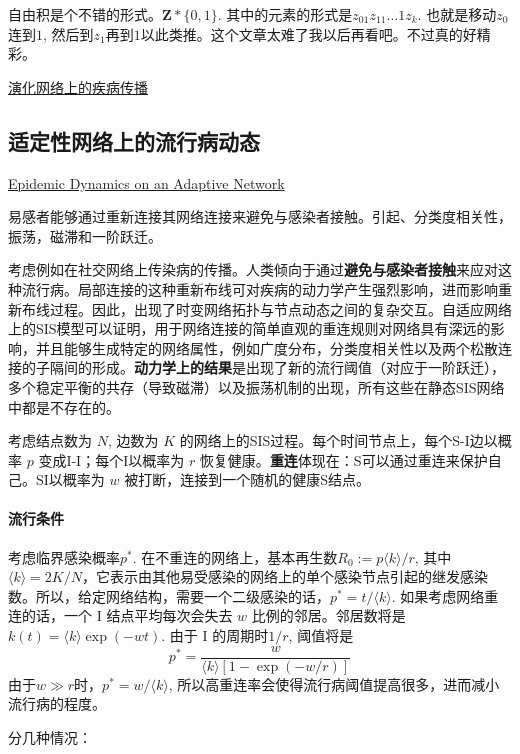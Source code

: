 自由积是个不错的形式。$\mathbf{Z}*\{0,1\}$. 其中的元素的形式是$z_01z_11\dots 1z_k$. 也就是移动$z_0$连到$1$, 然后到$z_{1}$再到$1$以此类推。这个文章太难了我以后再看吧。不过真的好精彩。

\href{https://journals.aps.org/pre/pdf/10.1103/PhysRevE.82.036112}{演化网络上的疾病传播}

\subsection{适定性网络上的流行病动态}
\href{https://journals.aps.org/prl/abstract/10.1103/PhysRevLett.96.208701}{Epidemic Dynamics on an Adaptive Network}

易感者能够通过重新连接其网络连接来避免与感染者接触。引起、分类度相关性，振荡，磁滞和一阶跃迁。

考虑例如在社交网络上传染病的传播。人类倾向于通过\textbf{避免与感染者接触}来应对这种流行病。局部连接的这种重新布线可对疾病的动力学产生强烈影响，进而影响重新布线过程。因此，出现了时变网络拓扑与节点动态之间的复杂交互。自适应网络上的SIS模型可以证明，用于网络连接的简单直观的重连规则对网络具有深远的影响，并且能够生成特定的网络属性，例如广度分布，分类度相关性以及两个松散连接的子隔间的形成。\textbf{动力学上的结果}是出现了新的流行阈值（对应于一阶跃迁），多个稳定平衡的共存（导致磁滞）以及振荡机制的出现，所有这些在静态SIS网络中都是不存在的。

考虑结点数为 $N$, 边数为 $K$ 的网络上的SIS过程。每个时间节点上，每个S-I边以概率 $p$ 变成I-I；每个I以概率为 $r$  恢复健康。\textbf{重连}体现在：S可以通过重连来保护自己。SI以概率为 $w$ 被打断，连接到一个随机的健康S结点。

\paragraph{流行条件}考虑临界感染概率$p^*$. 在不重连的网络上，基本再生数$R_{0}:=p\langle k\rangle / r$, 其中 $\langle k\rangle=2 K / N$，它表示由其他易受感染的网络上的单个感染节点引起的继发感染数。所以，给定网络结构，需要一个二级感染的话，$p^* = t/\langle k \rangle$. 如果考虑网络重连的话，一个 I 结点平均每次会失去 $w$ 比例的邻居。邻居数将是 $k(t)=\langle k\rangle \exp (-w t)$. 由于 I 的周期时$1/r$, 阈值将是\begin{equation}
    p^{*}=\frac{w}{\langle k\rangle[1-\exp (-w / r)]}\label{eq:rewire_threshold}
\end{equation}
由于$w\gg r$时，$p^* = w/\langle k\rangle$, 所以高重连率会使得流行病阈值提高很多，进而减小流行病的程度。

分几种情况：

